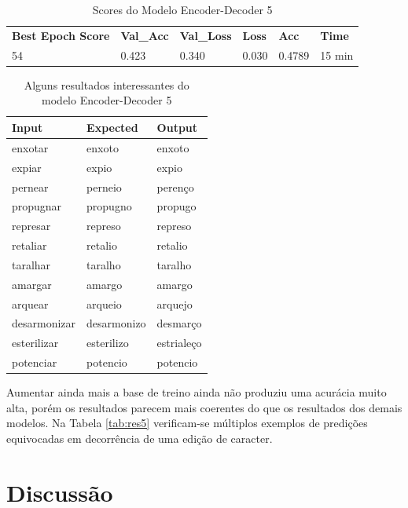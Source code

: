 \begin{table}[H]
\centering
\begin{tabular}{llllll}
\textbf{Best Epoch Score} & \textbf{Val\_Acc} & \textbf{Val\_Loss} & \textbf{Loss} & \textbf{Acc} & \textbf{Time} \\
54 & 0.423 & 0.340 & 0.030 & 0.4789 & 15 min
\end{tabular}
\caption{Scores do Modelo Encoder-Decoder 5}
\label{tab:res-enc-dec-5}
\end{table}

\begin{table}[H]
\centering
\begin{tabular}{lll}
\textbf{Input} & \textbf{Expected} & \textbf{Output} \\ \hline
enxotar& enxoto& enxoto\\
expiar& expio& expio\\
pernear& perneio& perenço\\
propugnar& propugno& propugo\\
represar& represo& represo\\
retaliar& retalio& retalio\\
taralhar& taralho& taralho\\
amargar& amargo& amargo\\
arquear& arqueio& arquejo\\
desarmonizar& desarmonizo& desmarço\\
esterilizar& esterilizo& estrialeço\\
potenciar& potencio& potencio
\end{tabular}
\caption{Alguns resultados interessantes do modelo Encoder-Decoder 5}
\label{tab:resumo5}
\end{table}

Aumentar ainda mais a base de treino ainda não produziu uma acurácia muito alta, porém os resultados parecem mais coerentes do que os resultados dos demais modelos. Na Tabela \ref{tab:res5} verificam-se múltiplos exemplos de predições equivocadas em decorrência de uma edição de caracter.

\section{Discussão}
\label{sec:disc}

